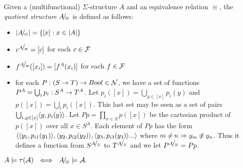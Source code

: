 \begin{DEFINITION}\label{de:predquot}
Given a (multifunctional) $\Sigma$-structure $A$ and an equivalence relation $\equiv$,
the {\em quotient structure} $A\!{\textstyle /}\!_\equiv$ is defined as follows: \begin{itemize}\MyLPar
\item $|A\!{\textstyle /}\!_\equiv| = \{[x]:x\in |A|\}$ \item $c^{A\!{\textstyle /}\!_\equiv} = [c]$ for each $c\in{\cal F}$ \item $f^{A\!{\textstyle /}\!_\equiv}([x_i]) = [f^A(x_i)]$ for each $f\in{\cal F}$ \item for each $P:(S\rightarrow T)\rightarrow Bool \in \cal N$, we have a set of functions $P^A=\bigcup_i p_i:S^A\rightarrow T^A$. 
Let $p_i([x]) = \bigcup_{y\in [x]}p_i(y)$ and $p([x])=\bigcup_i p_i([x]).$ This last set may be seen as a set of pairs $\bigcup_{i,y\in[x]}\langle y,p_i(y)\rangle$.
Let $Pp=\prod_{x\in S}p([x])$ be the cartesian product of $p([x])$ over all $x\in S^A$. Each element of $Pp$ has the form $\langle\langle y_1,p_{i1}(y_1)\rangle,\langle y_2,p_{i2}(y_2)\rangle,\langle y_3,p_{i3}(y_3)\rangle...\rangle$ where $m\Not = n\impl y_m\Not\equiv y_n$.
Thus it defines a function from $S^{A\!{\textstyle /}\!_\equiv}$ to $T^{A\!{\textstyle /}\!_\equiv}$ and
we let $P^{A\!{\textstyle /}\!_\equiv}=Pp$.
\end{itemize}
\end{DEFINITION}
\begin{THEOREM}\label{th:predcorrect}
$A\models \tau({\cal A})\ \ \mathrel{\Longleftrightarrow}\ \ A\!{\textstyle /}\!_\equiv\models {\cal A}.$ \end{THEOREM}
